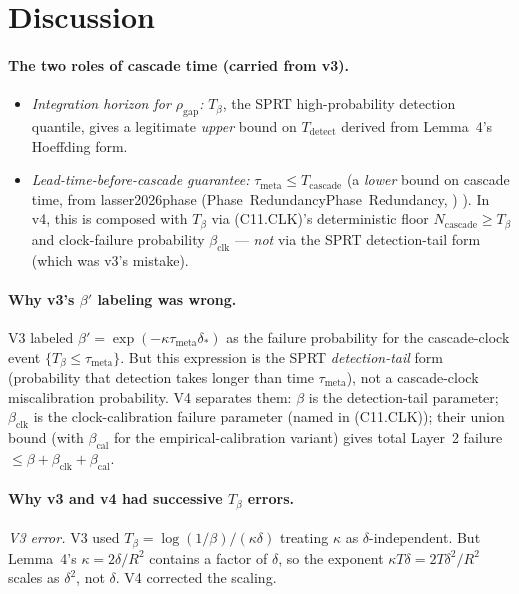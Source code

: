 \documentclass{article}
\makeatletter
\newcommand{\citep}[2][]{%
  \begingroup
  \def\@tmpkey{#2}%
  \ifx\@tmpkey\@empty\else
    (\ifx\@empty#1\@empty\else #1, \fi
     \@nameuse{bibkey@\@tmpkey})%
  \fi
  \endgroup
}
\newcommand{\deltastar}{\delta_{*}}
\newcommand{\rhogap}{\rho_{\mathrm{gap}}}
\newcommand{\Tbeta}{T_{\beta}}
\newcommand{\Ncasc}{N_{\mathrm{cascade}}}
\newcommand{\bclk}{\beta_{\mathrm{clk}}}
\newcommand{\bcal}{\beta_{\mathrm{cal}}}
\makeatother
\begin{document}
\section{Discussion}

\paragraph{The two roles of cascade time (carried from v3).}
\begin{itemize}
\item \emph{Integration horizon for $\rhogap$:} $\Tbeta$, the SPRT
  high-probability detection quantile, gives a legitimate
  \emph{upper} bound on $T_{\mathrm{detect}}$ derived from
  Lemma~4's Hoeffding form.
\item \emph{Lead-time-before-cascade guarantee:}
  $\tau_{\mathrm{meta}} \leq T_{\mathrm{cascade}}$ (a \emph{lower}
  bound on cascade time, from
  \citep[Phase~Redundancy]{lasser2026phase}).  In v4, this is
  composed with $\Tbeta$ via (C11.CLK)'s deterministic floor
  $\Ncasc \geq \Tbeta$ and clock-failure probability $\bclk$ —
  \emph{not} via the SPRT detection-tail form (which was v3's
  mistake).
\end{itemize}

\paragraph{Why v3's $\beta'$ labeling was wrong.}
V3 labeled $\beta' = \exp(-\kappa \tau_{\mathrm{meta}} \deltastar)$
as the failure probability for the cascade-clock event $\{\Tbeta
\leq \tau_{\mathrm{meta}}\}$.  But this expression is the SPRT
\emph{detection-tail} form (probability that detection takes longer
than time $\tau_{\mathrm{meta}}$), not a cascade-clock
miscalibration probability.  V4 separates them: $\beta$ is the
detection-tail parameter; $\bclk$ is the clock-calibration failure
parameter (named in (C11.CLK)); their union bound (with $\bcal$
for the empirical-calibration variant) gives total Layer~2 failure
$\leq \beta + \bclk + \bcal$.

\paragraph{Why v3 and v4 had successive $\Tbeta$ errors.}
\emph{V3 error.}  V3 used $\Tbeta = \log(1/\beta)/(\kappa \delta)$
treating $\kappa$ as $\delta$-independent.  But Lemma~4's
$\kappa = 2\delta/R^2$ contains a factor of $\delta$, so the exponent
$\kappa T \delta = 2T\delta^2/R^2$ scales as $\delta^2$, not
$\delta$.  V4 corrected the scaling.
\end{document}
